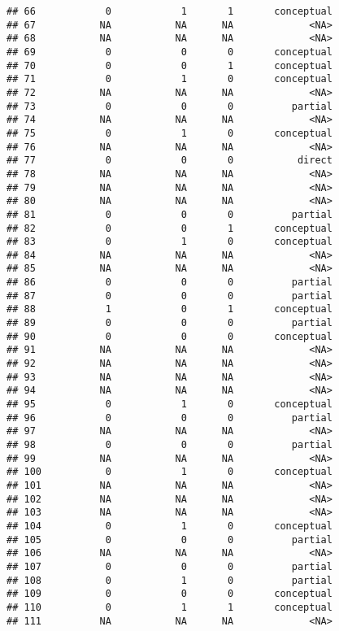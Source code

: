 \documentclass[
  english,
  man]{apa6}
\begin{document}
\begin{verbatim}
## 66            0            1       1       conceptual
## 67           NA           NA      NA             <NA>
## 68           NA           NA      NA             <NA>
## 69            0            0       0       conceptual
## 70            0            0       1       conceptual
## 71            0            1       0       conceptual
## 72           NA           NA      NA             <NA>
## 73            0            0       0          partial
## 74           NA           NA      NA             <NA>
## 75            0            1       0       conceptual
## 76           NA           NA      NA             <NA>
## 77            0            0       0           direct
## 78           NA           NA      NA             <NA>
## 79           NA           NA      NA             <NA>
## 80           NA           NA      NA             <NA>
## 81            0            0       0          partial
## 82            0            0       1       conceptual
## 83            0            1       0       conceptual
## 84           NA           NA      NA             <NA>
## 85           NA           NA      NA             <NA>
## 86            0            0       0          partial
## 87            0            0       0          partial
## 88            1            0       1       conceptual
## 89            0            0       0          partial
## 90            0            0       0       conceptual
## 91           NA           NA      NA             <NA>
## 92           NA           NA      NA             <NA>
## 93           NA           NA      NA             <NA>
## 94           NA           NA      NA             <NA>
## 95            0            1       0       conceptual
## 96            0            0       0          partial
## 97           NA           NA      NA             <NA>
## 98            0            0       0          partial
## 99           NA           NA      NA             <NA>
## 100           0            1       0       conceptual
## 101          NA           NA      NA             <NA>
## 102          NA           NA      NA             <NA>
## 103          NA           NA      NA             <NA>
## 104           0            1       0       conceptual
## 105           0            0       0          partial
## 106          NA           NA      NA             <NA>
## 107           0            0       0          partial
## 108           0            1       0          partial
## 109           0            0       0       conceptual
## 110           0            1       1       conceptual
## 111          NA           NA      NA             <NA>

\end{verbatim}
\end{document}
